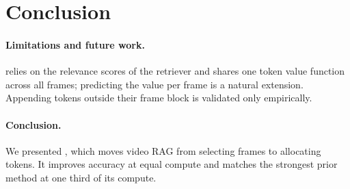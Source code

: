 \section{Conclusion}
\label{sec:conclusion}

\paragraph{Limitations and future work.}
\name relies on the relevance scores of the retriever and shares one token value function across all frames;
predicting the value per frame is a natural extension. Appending tokens outside their frame block is validated only empirically.

\paragraph{Conclusion.}
We presented \name, which moves video RAG from selecting frames to allocating tokens. It improves accuracy at equal compute and matches the
strongest prior method at one third of its compute.
\par
